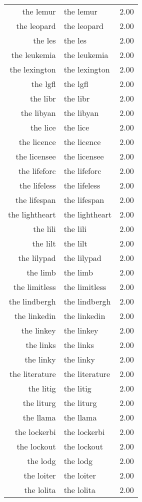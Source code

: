 \begin{table}[ht]
\begin{tabular}{rlr}
  the lemur & the lemur & 2.00 \\ 
  the leopard & the leopard & 2.00 \\ 
  the les & the les & 2.00 \\ 
  the leukemia & the leukemia & 2.00 \\ 
  the lexington & the lexington & 2.00 \\ 
  the lgfl & the lgfl & 2.00 \\ 
  the libr & the libr & 2.00 \\ 
  the libyan & the libyan & 2.00 \\ 
  the lice & the lice & 2.00 \\ 
  the licence & the licence & 2.00 \\ 
  the licensee & the licensee & 2.00 \\ 
  the lifeforc & the lifeforc & 2.00 \\ 
  the lifeless & the lifeless & 2.00 \\ 
  the lifespan & the lifespan & 2.00 \\ 
  the lightheart & the lightheart & 2.00 \\ 
  the lili & the lili & 2.00 \\ 
  the lilt & the lilt & 2.00 \\ 
  the lilypad & the lilypad & 2.00 \\ 
  the limb & the limb & 2.00 \\ 
  the limitless & the limitless & 2.00 \\ 
  the lindbergh & the lindbergh & 2.00 \\ 
  the linkedin & the linkedin & 2.00 \\ 
  the linkey & the linkey & 2.00 \\ 
  the links & the links & 2.00 \\ 
  the linky & the linky & 2.00 \\ 
  the literature & the literature & 2.00 \\ 
  the litig & the litig & 2.00 \\ 
  the liturg & the liturg & 2.00 \\ 
  the llama & the llama & 2.00 \\ 
  the lockerbi & the lockerbi & 2.00 \\ 
  the lockout & the lockout & 2.00 \\ 
  the lodg & the lodg & 2.00 \\ 
  the loiter & the loiter & 2.00 \\ 
  the lolita & the lolita & 2.00 \\ 

\end{tabular}
\end{table}
